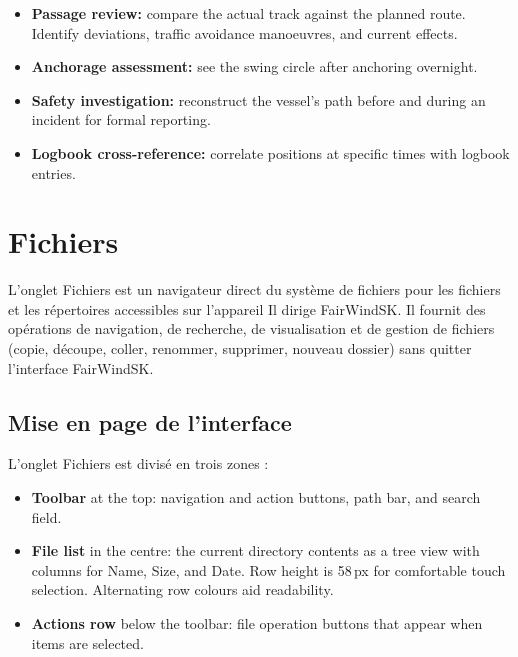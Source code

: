 \begin{itemize}
  \item \textbf{Passage review:} compare the actual track against the planned route. Identify deviations, traffic avoidance manoeuvres, and current effects.
  \item \textbf{Anchorage assessment:} see the swing circle after anchoring overnight.
  \item \textbf{Safety investigation:} reconstruct the vessel's path before and during an incident for formal reporting.
  \item \textbf{Logbook cross-reference:} correlate positions at specific times with logbook entries.
\end{itemize}

\chapter{Fichiers}
\label{ch:files}

L'onglet Fichiers est un navigateur direct du système de fichiers pour les fichiers et les répertoires accessibles sur l'appareil
Il dirige FairWindSK.
Il fournit des opérations de navigation, de recherche, de visualisation et de gestion de fichiers (copie, découpe, coller, renommer,
supprimer, nouveau dossier) sans quitter l'interface FairWindSK.


\section{Mise en page de l'interface}

L'onglet Fichiers est divisé en trois zones :

\begin{itemize}
  \item \textbf{Toolbar} at the top: navigation and action buttons, path bar, and search field.
  \item \textbf{File list} in the centre: the current directory contents as a tree view with columns for Name, Size, and Date. Row height is 58\,px for comfortable touch selection. Alternating row colours aid readability.
  \item \textbf{Actions row} below the toolbar: file operation buttons that appear when items are selected.
\end{itemize}

